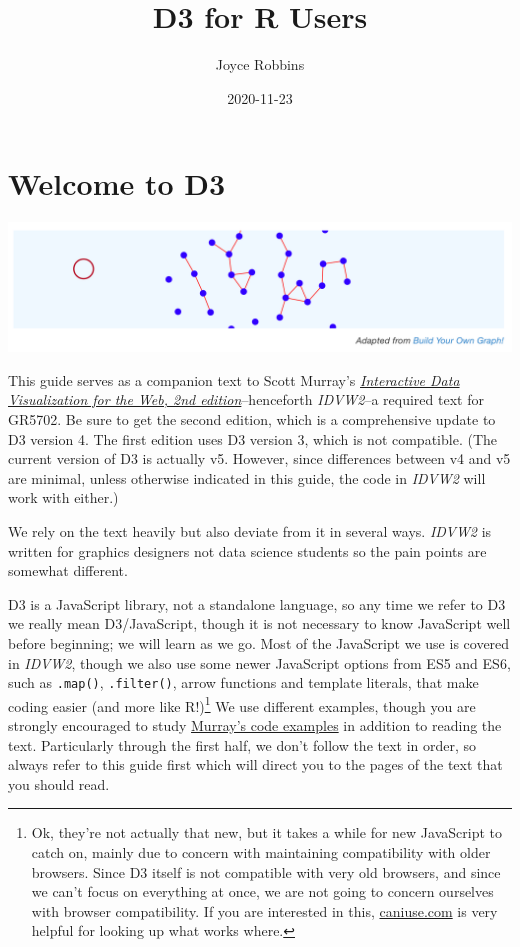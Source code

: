 \documentclass[
  openany]{book}
\title{D3 for R Users}
\author{Joyce Robbins}
\date{2020-11-23}
\begin{document}
\maketitle

{
\setcounter{tocdepth}{1}
\tableofcontents
}
\hypertarget{welcome-to-d3}{%
\chapter*{Welcome to D3}\label{welcome-to-d3}}

\hypertarget{container}{}

\includegraphics[width=1\linewidth]{images/pdfbook/buildyourowngraph}

This guide serves as a companion text to Scott Murray's \href{https://www.amazon.com/Interactive-Data-Visualization-Web-Introduction/dp/1491921285/}{\emph{Interactive Data Visualization for the Web, 2nd edition}}--henceforth \emph{IDVW2}--a required text for GR5702. Be sure to get the second edition, which is a comprehensive update to D3 version 4. The first edition uses D3 version 3, which is not compatible. (The current version of D3 is actually v5. However, since differences between v4 and v5 are minimal, unless otherwise indicated in this guide, the code in \emph{IDVW2} will work with either.)

We rely on the text heavily but also deviate from it in several ways. \emph{IDVW2} is written for graphics designers not data science students so the pain points are somewhat different.

D3 is a JavaScript library, not a standalone language, so any time we refer to D3 we really mean D3/JavaScript, though it is not necessary to know JavaScript well before beginning; we will learn as we go. Most of the JavaScript we use is covered in \emph{IDVW2}, though we also use some newer JavaScript options from ES5 and ES6, such as \texttt{.map()}, \texttt{.filter()}, arrow functions and template literals, that make coding easier (and more like R!)\footnote{Ok, they're not actually that new, but it takes a while for new JavaScript to catch on, mainly due to concern with maintaining compatibility with older browsers. Since D3 itself is not compatible with very old browsers, and since we can't focus on everything at once, we are not going to concern ourselves with browser compatibility. If you are interested in this, \href{https://caniuse.com}{caniuse.com} is very helpful for looking up what works where.} We use different examples, though you are strongly encouraged to study \href{https://github.com/alignedleft/d3-book/releases}{Murray's code examples} in addition to reading the text. Particularly through the first half, we don't follow the text in order, so always refer to this guide first which will direct you to the pages of the text that you should read.
\end{document}
